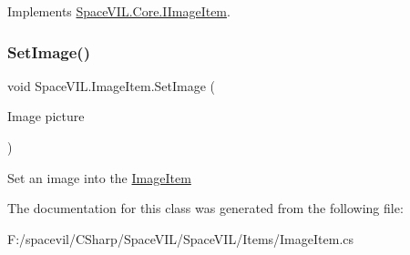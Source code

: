 Implements \mbox{\hyperlink{interface_space_v_i_l_1_1_core_1_1_i_image_item}{Space\+V\+I\+L.\+Core.\+I\+Image\+Item}}.

\mbox{\label{class_space_v_i_l_1_1_image_item_ae62563d3131e913b37293731fa535205}} 
\subsubsection{\texorpdfstring{Set\+Image()}{SetImage()}}
{\footnotesize\ttfamily void Space\+V\+I\+L.\+Image\+Item.\+Set\+Image (\begin{DoxyParamCaption}\item[{Image}]{picture }\end{DoxyParamCaption})}



Set an image into the \mbox{\hyperlink{class_space_v_i_l_1_1_image_item}{Image\+Item}} 



The documentation for this class was generated from the following file\+:\begin{DoxyCompactItemize}
\item 
F\+:/spacevil/\+C\+Sharp/\+Space\+V\+I\+L/\+Space\+V\+I\+L/\+Items/Image\+Item.\+cs\end{DoxyCompactItemize}
